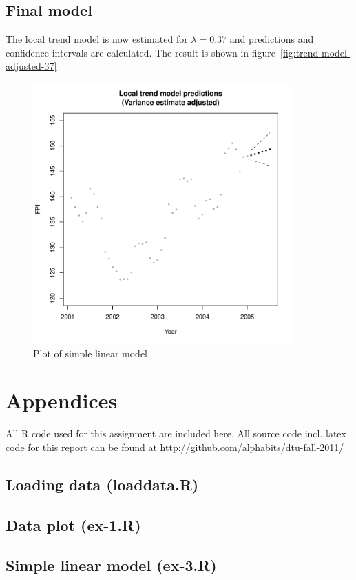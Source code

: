 \documentclass[11pt]{article}
\begin{document}
\subsection*{Final model}
The local trend model is now estimated for $\lambda=0.37$ and predictions and confidence intervals are calculated. The result is shown in figure~\ref{fig:trend-model-adjusted-37}

\begin{figure}
    \centering
    \includegraphics[width=100mm]{local-trend-predict-adjusted-37.pdf}
    \caption{Plot of simple linear model}
    \label{fig:local-trend-model-adjusted-37}
\end{figure}


\pagebreak

\section*{Appendices}
All R code used for this assignment are included here. All source code incl. latex code for this report can be found at \url{http://github.com/alphabits/dtu-fall-2011/}
\subsection*{Loading data (loaddata.R)}

\subsection*{Data plot (ex-1.R)}

\subsection*{Simple linear model (ex-3.R)}

\end{document}
